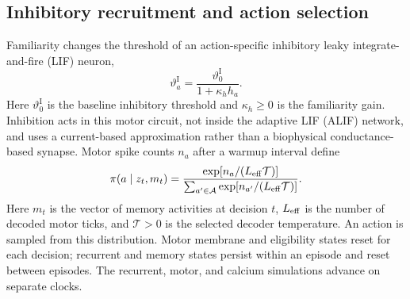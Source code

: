 \subsection{Inhibitory recruitment and action selection}
Familiarity changes the threshold of an action-specific inhibitory leaky integrate-and-fire (LIF) neuron,
\begin{equation}
 \vartheta^{\mathrm I}_a=\frac{\vartheta^{\mathrm I}_0}{1+\kappa_h h_a}.
\end{equation}
Here $\vartheta^{\mathrm I}_0$ is the baseline inhibitory threshold and $\kappa_h\geq0$ is the familiarity gain. Inhibition acts in this motor circuit, not inside the adaptive LIF (ALIF) network, and uses a current-based approximation rather than a biophysical conductance-based synapse. Motor spike counts $n_a$ after a warmup interval define
\begin{equation}
 \pi(a\mid z_t,m_t)=
 \frac{\exp[n_a/(L_{\rm eff}\mathcal T)]}{\sum_{a'\in\mathcal A}\exp[n_{a'}/(L_{\rm eff}\mathcal T)]}.
\end{equation}
Here $m_t$ is the vector of memory activities at decision $t$, $L_{\rm eff}$ is the number of decoded motor ticks, and $\mathcal T>0$ is the selected decoder temperature. An action is sampled from this distribution. Motor membrane and eligibility states reset for each decision; recurrent and memory states persist within an episode and reset between episodes. The recurrent, motor, and calcium simulations advance on separate clocks.

